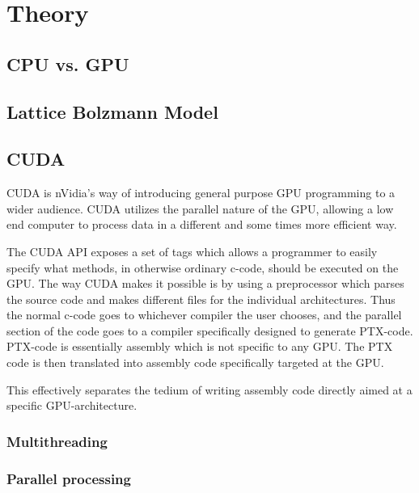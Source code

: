 \section{Theory}

\subsection{CPU vs. GPU}

\subsection{Lattice Bolzmann Model}

\subsection{CUDA}
CUDA is nVidia's way of introducing general purpose GPU programming to a wider audience. CUDA utilizes the parallel nature of the GPU, allowing a low end computer to process data in a different and some times more efficient way.

The CUDA API exposes a set of tags which allows a programmer to easily specify what methods, in otherwise ordinary c-code, should be executed on the GPU. The way CUDA makes it possible is by using a preprocessor which parses the source code and makes different files for the individual architectures. Thus the normal c-code goes to whichever compiler the user chooses, and the parallel section of the code goes to a compiler specifically designed to generate PTX-code. PTX-code is essentially assembly which is not specific to any GPU. The PTX code is then translated into assembly code specifically targeted at the GPU.

This effectively separates the tedium of writing assembly code directly aimed at a specific GPU-architecture.

\subsubsection{Multithreading}

\subsubsection{Parallel processing}
